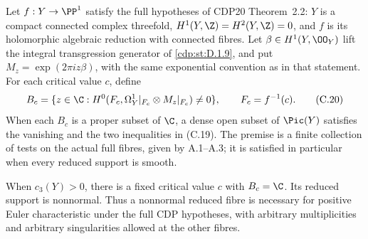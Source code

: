 
\begin{proposition}\label{cdp:st:C4d}
Let $f:Y\to\PP^1$ satisfy the full hypotheses of CDP20 Theorem~2.2: $Y$ is a compact connected complex threefold, $H^1(Y,\Z)=H^2(Y,\Z)=0$, and $f$ is its holomorphic algebraic reduction with connected fibres. Let $\beta\in H^1(Y,\OO_Y)$ lift the integral transgression generator of \ref{cdp:st:D.1.9}, and put $M_z=\exp(2\pi i z\beta)$, with the same exponential convention as in that statement. For each critical value $c$, define
\[
 B_c=\{z\in\C:
 H^0(F_c,\Omega_Y^1|_{F_c}\otimes M_z|_{F_c})\ne0\},
 \qquad F_c=f^{-1}(c).
 \tag{C.20}\label{cdp:eq:C.20}
\]
When each $B_c$ is a proper subset of $\C$, a dense open subset of $\Pic(Y)$ satisfies the vanishing and the two inequalities in (C.19). The premise is a finite collection of tests on the actual full fibres, given by A.1--A.3; it is satisfied in particular when every reduced support is smooth.

When $c_3(Y)>0$, there is a fixed critical value $c$ with $B_c=\C$. Its reduced support is nonnormal. Thus a nonnormal reduced fibre is necessary for positive Euler characteristic under the full CDP hypotheses, with arbitrary multiplicities and arbitrary singularities allowed at the other fibres.
\end{proposition}

